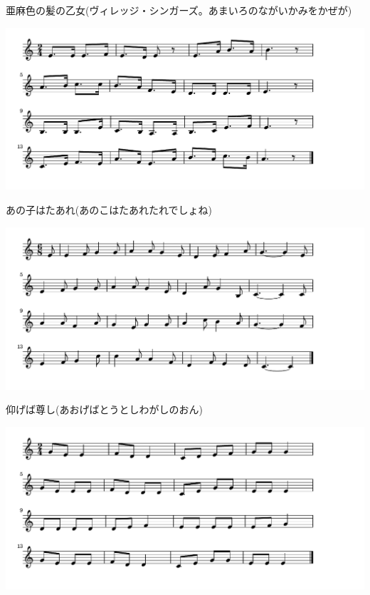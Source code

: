 \documentclass[a4paper]{ltjsarticle}
\begin{document}
\vspace{-10mm} \hspace{10mm}
亜麻色の髪の乙女(ヴィレッジ・シンガーズ。あまいろのながいかみをかぜが)

\includegraphics[clip]{anokowatare_crop.pdf}

\vspace{-10mm} \hspace{10mm}
あの子はたあれ(あのこはたあれたれでしょね)

\includegraphics[clip]{aogeba_crop.pdf}

\vspace{-10mm} \hspace{10mm}
仰げば尊し(あおげばとうとしわがしのおん)

\includegraphics[clip]{chouchou_crop.pdf}
\end{document}
